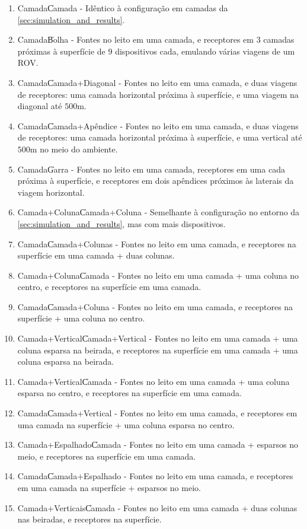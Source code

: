 \begin{enumerate}[label=(\alph*)]
	\item Camada\|Camada - Idêntico à configuração em camadas da \cref{sec:simulation_and_results}.
	\item Camada\|Bolha - Fontes no leito em uma camada, e receptores em 3 camadas próximas à superfície de 9 dispositivos cada, emulando várias viagens de um ROV.
	\item Camada\|Camada+Diagonal - Fontes no leito em uma camada, e duas viagens de receptores: uma camada horizontal próxima à superfície, e uma viagem na diagonal até $500\si{\meter}$.
	\item Camada\|Camada+Apêndice - Fontes no leito em uma camada, e duas viagens de receptores: uma camada horizontal próxima à superfície, e uma vertical até $500\si{\meter}$ no meio do ambiente.
	\item Camada\|Garra - Fontes no leito em uma camada, receptores em uma cada próxima à superfície, e receptores em dois apêndices próximos às laterais da viagem horizontal.\\
	
	\item Camada+Coluna\|Camada+Coluna - Semelhante à configuração no entorno da \cref{sec:simulation_and_results}, mas com mais dispositivos.
	\item Camada\|Camada+Colunas - Fontes no leito em uma camada, e receptores na superfície em uma camada + duas colunas.
	\item Camada+Coluna\|Camada - Fontes no leito em uma camada + uma coluna no centro, e receptores na superfície em uma camada.
	\item Camada\|Camada+Coluna - Fontes no leito em uma camada, e receptores na superfície + uma coluna no centro.\\
	
	\item Camada+Vertical\|Camada+Vertical - Fontes no leito em uma camada + uma coluna esparsa na beirada, e receptores na superfície em uma camada + uma coluna esparsa na beirada.
	\item Camada+Vertical\|Camada - Fontes no leito em uma camada + uma coluna esparsa no centro, e receptores na superfície em uma camada.
	\item Camada\|Camada+Vertical - Fontes no leito em uma camada, e receptores em uma camada na superfície + uma coluna esparsa no centro.
	\item Camada+Espalhado\|Camada - Fontes no leito em uma camada + esparsos no meio, e receptores na superfície em uma camada.
	\item Camada\|Camada+Espalhado - Fontes no leito em uma camada, e receptores em uma camada na superfície + esparsos no meio.
	\item Camada+Verticais\|Camada - Fontes no leito em uma camada + duas colunas nas beiradas, e receptores na superfície.
\end{enumerate}

